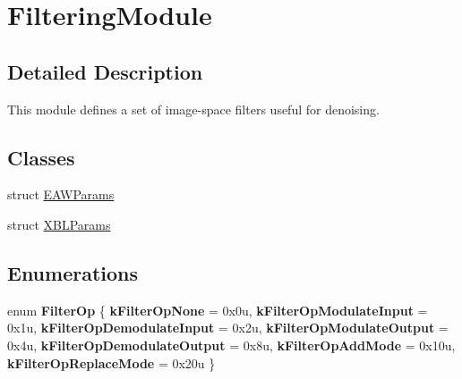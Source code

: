 \hypertarget{group___filtering_module}{}\section{Filtering\+Module}
\label{group___filtering_module}


\subsection{Detailed Description}
\begin{DoxyParagraph}{}
This module defines a set of image-\/space filters useful for denoising. 
\end{DoxyParagraph}
\subsection*{Classes}
\begin{DoxyCompactItemize}
\item 
struct \hyperlink{struct_e_a_w_params}{E\+A\+W\+Params}
\item 
struct \hyperlink{struct_x_b_l_params}{X\+B\+L\+Params}
\end{DoxyCompactItemize}
\subsection*{Enumerations}
\begin{DoxyCompactItemize}
\item 
\mbox{\label{group___filtering_module_ga38dd9d909bafda3d5fc83f49446616dc}} 
enum {\bfseries Filter\+Op} \{ \newline
{\bfseries k\+Filter\+Op\+None} = 0x0u, 
{\bfseries k\+Filter\+Op\+Modulate\+Input} = 0x1u, 
{\bfseries k\+Filter\+Op\+Demodulate\+Input} = 0x2u, 
{\bfseries k\+Filter\+Op\+Modulate\+Output} = 0x4u, 
\newline
{\bfseries k\+Filter\+Op\+Demodulate\+Output} = 0x8u, 
{\bfseries k\+Filter\+Op\+Add\+Mode} = 0x10u, 
{\bfseries k\+Filter\+Op\+Replace\+Mode} = 0x20u
 \}
\end{DoxyCompactItemize}
